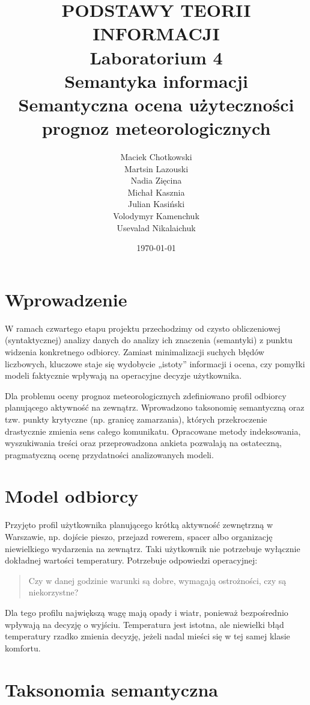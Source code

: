 \documentclass[a4paper,12pt]{article}
\title{
    \vspace{1.5cm}
    \textbf{PODSTAWY TEORII INFORMACJI}\\
    \vspace{1.5cm}
    Laboratorium 4\\
    Semantyka informacji\\
    \vspace{1.5cm}
    \huge \textbf{Semantyczna ocena użyteczności prognoz meteorologicznych}\\
    \vspace{1cm}
}
\author{
    Maciek Chotkowski \\ Martsin Lazouski \\ Nadia Zięcina \\
    Michał Kasznia \\ Julian Kasiński \\ Volodymyr Kamenchuk \\ Usevalad Nikalaichuk
}
\date{\today}
\begin{document}
\maketitle
\newpage

\tableofcontents
\newpage
\section{Wprowadzenie}

W ramach czwartego etapu projektu przechodzimy od czysto obliczeniowej (syntaktycznej) analizy danych do analizy ich znaczenia (semantyki) z punktu widzenia konkretnego odbiorcy. Zamiast minimalizacji suchych błędów liczbowych, kluczowe staje się wydobycie „istoty” informacji i ocena, czy pomyłki modeli faktycznie wpływają na operacyjne decyzje użytkownika.

\noindent
Dla problemu oceny prognoz meteorologicznych zdefiniowano profil odbiorcy planującego aktywność na zewnątrz. Wprowadzono taksonomię semantyczną oraz tzw. punkty krytyczne (np. granicę zamarzania), których przekroczenie drastycznie zmienia sens całego komunikatu. Opracowane metody indeksowania, wyszukiwania treści oraz przeprowadzona ankieta pozwalają na ostateczną, pragmatyczną ocenę przydatności analizowanych modeli.

\section{Model odbiorcy}

Przyjęto profil użytkownika planującego krótką aktywność zewnętrzną w Warszawie,
np. dojście pieszo, przejazd rowerem, spacer albo organizację niewielkiego
wydarzenia na zewnątrz. Taki użytkownik nie potrzebuje wyłącznie dokładnej
wartości temperatury. Potrzebuje odpowiedzi operacyjnej:
\begin{quote}
Czy w danej godzinie warunki są dobre, wymagają ostrożności, czy są
niekorzystne?
\end{quote}

\noindent
Dla tego profilu największą wagę mają opady i wiatr, ponieważ bezpośrednio
wpływają na decyzję o wyjściu. Temperatura jest istotna, ale niewielki błąd
temperatury rzadko zmienia decyzję, jeżeli nadal mieści się w tej samej klasie
komfortu.

\section{Taksonomia semantyczna}
\end{document}
